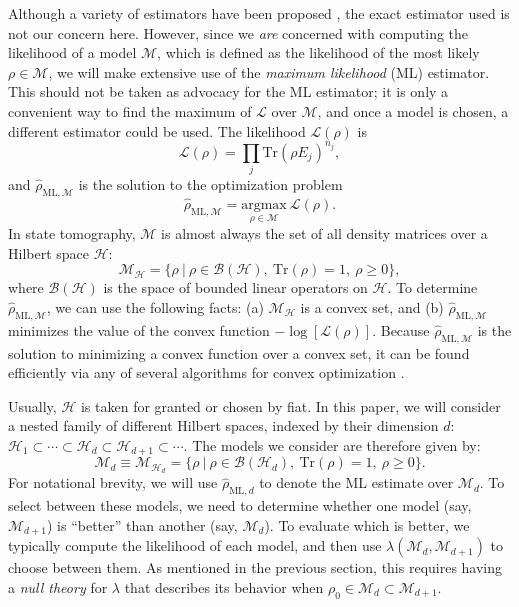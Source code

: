 \documentclass[aps,pra, twocolumn]{revtex4-1}
\newcommand{\M}{\mathcal{M}}
\newcommand{\cH}{\mathcal{H}}
\newcommand{\cL}{\mathcal{L}}
\newcommand{\rhohat}{\hat{\rho}}
\newcommand{\rhoML}[1]{\rhohat_{\scriptscriptstyle{\mathrm{ML},#1}}}
\begin{document}
Although a variety of estimators have been proposed \cite{Vogel1989,Hradil1997,JamesPRA2001,Blume-Kohout2010b,Blume-Kohout2010,Zhu2014a,Ferrie2016}, the exact estimator used is not our concern here.  However, since we \emph{are} concerned with computing the likelihood of a model $\M$, which is defined as the likelihood of the most likely $\rho\in\M$, we will make extensive use of the \emph{maximum likelihood} (ML) estimator.  This should not be taken as advocacy for the ML estimator; it is only a convenient way to find the maximum of $\cL$ over $\M$, and once a model is chosen, a different estimator could be used.
The likelihood $\mathcal{L}(\rho)$ is
\begin{equation}
\nonumber \mathcal{L}(\rho) = \prod_{j}\mathrm{Tr}(\rho E_{j})^{n_{j}},
\end{equation}
and $\rhoML{\M}$ is the solution to the optimization problem
\begin{equation}
\nonumber \rhoML{\M} = \underset{\rho \in \M}{\text{argmax}}~\mathcal{L}(\rho).
\end{equation}
In state tomography, $\M$ is almost always the set of all density matrices over a Hilbert space $\cH$:
\begin{equation}
\nonumber \mathcal{M}_{\cH} = \{\rho~|~\rho \in \mathcal{B}(\mathcal{H}),~\mathrm{Tr}(\rho) =1,~\rho \geq 0\},
\end{equation}
where $\mathcal{B}(\cH)$ is the space of bounded linear operators on $\cH$.  To determine $\rhoML{\M}$, we can use the following facts: (a) $\M_{\cH}$ is a convex set, and (b) $\rhoML{\M}$ minimizes the value of the convex function $-\log[\mathcal{L}(\rho)]$. Because $\rhoML{\M}$ is the solution to minimizing a convex function  over a convex set, it can be found efficiently via any of several algorithms for convex optimization \cite{Boyd}.

Usually, $\cH$ is taken for granted or chosen by fiat.  In this paper, we will consider a nested family of different Hilbert spaces, indexed by their dimension $d$: $\cH_{1}  \subset \cdots \subset \cH_{d} \subset \cH_{d+1} \subset \cdots$.  The models we consider are therefore given by:
\begin{equation}
\label{eq:modelsd}
\M_{d} \equiv \mathcal{M}_{\cH_{d}} = \{\rho~|~\rho \in \mathcal{B}(\mathcal{H}_{d}),~\mathrm{Tr}(\rho) =1,~\rho \geq 0\}.
\end{equation}
For notational brevity, we will use $\rhoML{d}$ to denote the ML estimate over $\M_{d}$. To select between these models, we need to determine whether one model (say, $\M_{d + 1}$) is ``better'' than another (say, $\M_{d}$).  To evaluate which is better, we typically compute the likelihood of each model, and then use $\lambda(\M_{d}, \M_{d+1})$ to choose between them. As mentioned in the previous section, this requires having a \emph{null theory} for $\lambda$ that describes its behavior when $\rho_{0} \in \M_{d} \subset \M_{d + 1}$.
\end{document}
